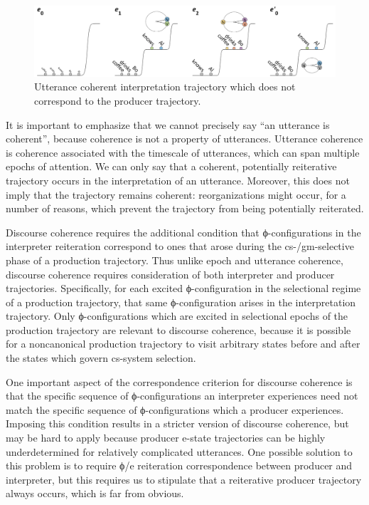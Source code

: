   
\begin{figure}
\includegraphics[width=\textwidth]{figures/Tilsen-img126.png}
\caption{Utterance coherent interpretation trajectory which does not correspond to the producer trajectory.}
\label{fig:6:7}
\end{figure}
 

  It is important to emphasize that we cannot precisely say “an utterance is coherent”, because coherence is not a property of utterances. Utterance coherence is coherence associated with the timescale of utterances, which can span multiple epochs of attention. We can only say that a coherent, potentially reiterative trajectory occurs in the interpretation of an utterance. Moreover, this does not imply that the trajectory remains coherent: reorganizations might occur, for a number of reasons, which prevent the trajectory from being potentially reiterated.

  Discourse coherence requires the additional condition that ϕ-configurations in the interpreter reiteration correspond to ones that arose during the cs-/gm-selective phase of a production trajectory. Thus unlike epoch and utterance coherence, discourse coherence requires consideration of both interpreter and producer trajectories. Specifically, for each excited ϕ-configuration in the selectional regime of a production trajectory, that same ϕ-configuration arises in the interpretation trajectory. Only ϕ-configurations which are excited in selectional epochs of the production trajectory are relevant to discourse coherence, because it is possible for a noncanonical production trajectory to visit arbitrary states before and after the states which govern cs-system selection. 

  One important aspect of the correspondence criterion for discourse coherence is that the specific sequence of ϕ-configurations an interpreter experiences need not match the specific sequence of ϕ-configurations which a producer experiences. Imposing this condition results in a stricter version of discourse coherence, but may be hard to apply because producer e-state trajectories can be highly underdetermined for relatively complicated utterances. One possible solution to this problem is to require ϕ/e reiteration correspondence between producer and interpreter, but this requires us to stipulate that a reiterative producer trajectory always occurs, which is far from obvious.

